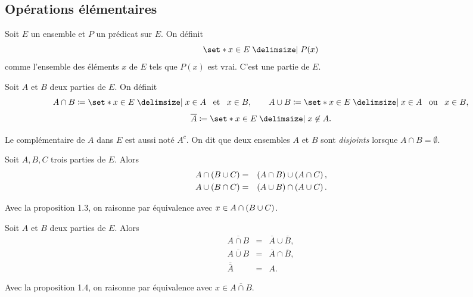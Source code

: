 \documentclass{magnoliaold}
\begin{document}
\subsection{Opérations élémentaires}

\begin{definition}[utile=-3]
Soit $E$ un ensemble et $P$ un prédicat sur $E$. On définit
\[\enstq{x\in E}{P(x)}\]
comme l'ensemble des éléments $x$ de $E$ tels que $P(x)$ est vrai. C'est une partie
de $E$.
\end{definition}

\begin{definition}[utile=-3]
Soit $A$ et $B$ deux parties de $E$. On définit
\[A\cap B\defeq\enstq{x\in E}{x\in A \et x\in B}, \qquad
  A\cup B\defeq\enstq{x\in E}{x\in A \ou x\in B},\]
\[\overline{A}\defeq\enstq{x\in E}{x\not\in A}.\]
\end{definition}

\begin{remarques}
\remarque Le complémentaire de $A$ dans $E$ est aussi noté $A^c$.
\remarque On dit que deux ensembles $A$ et $B$ sont \emph{disjoints} lorsque
  $A\cap B=\emptyset$.
\end{remarques}

\begin{proposition}[utile=-3]
Soit $A, B, C$ trois parties de $E$. Alors
\begin{eqnarray*}
A\cap\left(B\cup C\right)&=&\left(A\cap B\right)\cup\left(A\cap C\right),\\
A\cup\left(B\cap C\right)&=&\left(A\cup B\right)\cap\left(A\cup C\right).
\end{eqnarray*}
\end{proposition}

\begin{preuve}
Avec la proposition 1.3, on raisonne par équivalence avec $x\in A\cap\left(B\cup C\right)$.
\end{preuve}

\begin{proposition}[utile=-3, nom={Lois de \nom{Morgan}}]
Soit $A$ et $B$ deux parties de $E$. Alors
\begin{eqnarray*}
\overline{A\cap B}&=&\overline{A}\cup \overline{B},\\
\overline{A\cup B}&=&\overline{A}\cap \overline{B},\\
\overline{\overline{A}}&=&A.
\end{eqnarray*}
\end{proposition}

\begin{preuve}
Avec la proposition 1.4, on raisonne par équivalence avec $x\in \overline{A\cap B}$.
\end{preuve}
\end{document}
